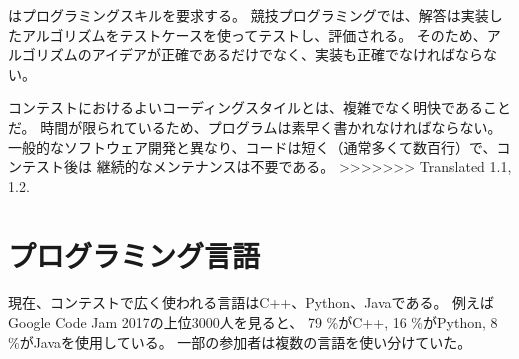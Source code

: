 はプログラミングスキルを要求する。
競技プログラミングでは、解答は実装したアルゴリズムをテストケースを使ってテストし、評価される。
そのため、アルゴリズムのアイデアが正確であるだけでなく、実装も正確でなければならない。

\begin{comment}
A good coding style in contests is
straightforward and concise.
Programs should be written quickly,
because there is not much time available.
Unlike in traditional software engineering,
<<<<<<< HEAD
the programs are short (usually at most a few
hundred lines of code), and they do not need to 
be maintained after the contest.
=======
the programs are short (usually at most some
hundreds of lines) and it is not needed to 
maintain them after the contest.
\end{comment}

コンテストにおけるよいコーディングスタイルとは、複雑でなく明快であることだ。
時間が限られているため、プログラムは素早く書かれなければならない。
一般的なソフトウェア開発と異なり、コードは短く（通常多くて数百行）で、コンテスト後は
継続的なメンテナンスは不要である。
>>>>>>> Translated 1.1, 1.2.

\begin{comment}
\section{Programming languages}

\index{programming language}
\end{comment}

\section{プログラミング言語}


\begin{comment}
At the moment, the most popular programming
languages used in contests are C++, Python and Java.
For example, in Google Code Jam 2017,
among the best 3,000 participants,
79 \% used C++,
16 \% used Python and
8 \% used Java \cite{goo17}.
Some participants also used several languages.
\end{comment}

現在、コンテストで広く使われる言語はC++、Python、Javaである。
例えばGoogle Code Jam 2017の上位3000人を見ると、
79 \%がC++, 16 \%がPython, 8 \%がJavaを使用している。
一部の参加者は複数の言語を使い分けていた。

